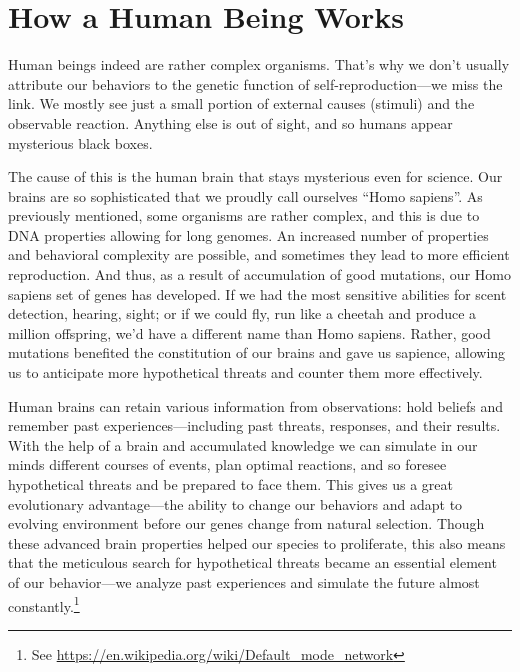 \documentclass[12pt]{report}
\begin{document}
\section*{How a Human Being Works}

Human beings indeed are rather complex organisms. That’s why we don’t usually attribute our behaviors to the genetic function of self-reproduction\thinspace---\thinspace we miss the link. We mostly see just a small portion of external causes (stimuli) and the observable reaction. Anything else is out of sight, and so humans appear mysterious black boxes.

\noindent The cause of this is the human brain that stays mysterious even for science. Our brains are so sophisticated that we proudly call ourselves ``Homo sapiens''. As previously mentioned, some organisms are rather complex, and this is due to DNA properties allowing for long genomes. An increased number of properties and behavioral complexity are possible, and sometimes they lead to more efficient reproduction. And thus, as a result of accumulation of good mutations, our Homo sapiens set of genes has developed. If we had the most sensitive abilities for scent detection, hearing, sight; or if we could fly, run like a cheetah and produce a million offspring, we’d have a different name than Homo sapiens. Rather, good mutations benefited the constitution of our brains and gave us sapience, allowing us to anticipate more hypothetical threats and counter them more effectively.

\noindent Human brains can retain various information from observations: hold beliefs and remember past experiences\thinspace---\thinspace including past threats, responses, and their results. With the help of a brain and accumulated knowledge we can simulate in our minds different courses of events, plan optimal reactions, and so foresee hypothetical threats and be prepared to face them. This gives us a great evolutionary advantage\thinspace---\thinspace the ability to change our behaviors and adapt to evolving environment before our genes change from natural selection. Though these advanced brain properties helped our species to proliferate, this also means that the meticulous search for hypothetical threats became an essential element of our behavior\thinspace---\thinspace we analyze past experiences and simulate the future almost constantly.\footnote{See \url{https://en.wikipedia.org/wiki/Default_mode_network}}
\end{document}

